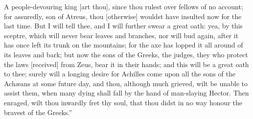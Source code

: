 \documentclass{ransom}
\begin{document}
A people-devouring king [art thou],
since thou rulest over fellows of no account; for assuredly, son of
Atreus, thou [otherwise] wouldst have insulted now for the last time.
But I will tell thee, and I will further swear a great oath: yea, by
this sceptre, which will never bear leaves and branches, nor will bud
again, after it has once left its trunk on the mountains; for the axe
has lopped it all around of its leaves and bark; but now the sons of
the Greeks, the judges, they who protect the laws [received] from Zeus,
bear it in their hands; and this will be a great oath to thee; surely
will a longing desire for Achilles come upon all the sons of the
Achæans at some future day, and thou, although much grieved, wilt be
unable to assist them, when many dying shall fall by the hand of
man-slaying Hector. Then enraged, wilt thou inwardly fret thy soul,
that thou didst in no way honour the bravest of the Greeks.”
\end{document}
